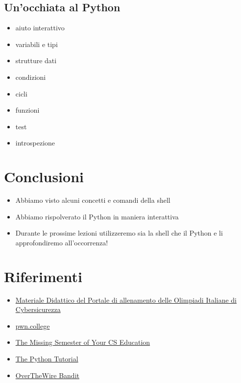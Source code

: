 \documentclass{beamer}
\begin{document}
\subsection*{Un'occhiata al Python}
\begin{frame}{\insertsubsection}
\begin{itemize}
\item aiuto interattivo
\item variabili e tipi
\item strutture dati
\item condizioni
\item cicli
\item funzioni
\item test
\item introspezione
\end{itemize}
\end{frame}

\section{Conclusioni}
\begin{frame}{\insertsection}
\begin{itemize}
\item Abbiamo visto alcuni concetti e comandi della \alert{shell}
\item Abbiamo rispolverato il \alert{Python} in maniera interattiva
\item Durante le prossime lezioni utilizzeremo sia la shell che il Python e li
approfondiremo all'occorrenza!
\end{itemize}
\end{frame}

\section{Riferimenti}
\begin{frame}{\insertsection}
\begin{itemize}
\item \href{https://training.olicyber.it/training}{Materiale Didattico del Portale di allenamento delle Olimpiadi Italiane di Cybersicurezza} 
\item \href{https://pwn.college/}{pwn.college}
\item \href{https://missing.csail.mit.edu/}{The Missing Semester of Your CS Education}
\item \href{https://docs.python.org/3/tutorial/index.html}{The Python Tutorial}
\item \href{https://overthewire.org/wargames/bandit/}{OverTheWire Bandit}
\end{itemize}
\end{frame}
\end{document}
